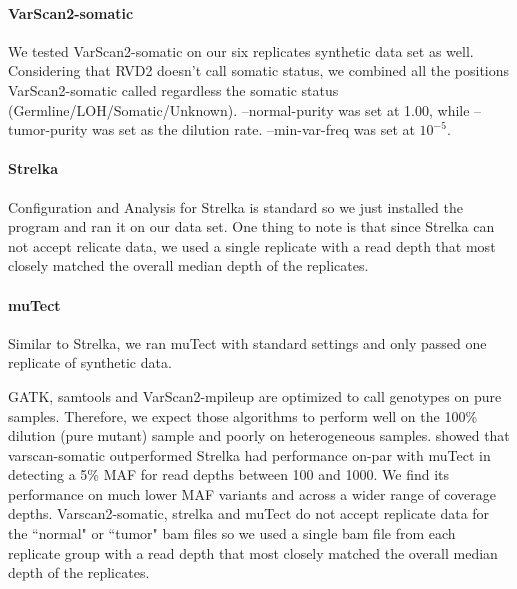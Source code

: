 \documentclass[11pt,reqno]{amsart}
\begin{document}
\paragraph{\textbf{VarScan2-somatic}}
We tested VarScan2-somatic on our six replicates synthetic data set as well. Considering that RVD2 doesn't call somatic status, we combined all the positions VarScan2-somatic called regardless the somatic status (Germline/LOH/Somatic/Unknown). --normal-purity was set at 1.00, while --tumor-purity was set as the dilution rate. --min-var-freq was set at $10^{-5}$.

\paragraph{\textbf{Strelka}}
Configuration and Analysis for Strelka is standard so we just installed the program and ran it on our data set. One thing to note is that since Strelka can not accept relicate data, we used a single replicate with a read depth that most closely matched the overall median depth of the replicates.

\paragraph{\textbf{muTect}}
Similar to Strelka, we ran muTect with standard settings and only passed one replicate of synthetic data.

GATK, samtools and VarScan2-mpileup are optimized to call genotypes on pure samples. Therefore, we expect those algorithms to perform well on the 100\% dilution (pure mutant) sample and poorly on heterogeneous samples. \citet{Stead:2013fu} showed that varscan-somatic outperformed Strelka had performance on-par with muTect in detecting a 5\% MAF for read depths between 100 and 1000. We find its performance on much lower MAF variants and across a wider range of coverage depths. Varscan2-somatic, strelka and muTect do not accept replicate data for the ``normal" or ``tumor" bam files so we used a single bam file from each replicate group with a read depth that most closely matched the overall median depth of the replicates.



\end{document}
